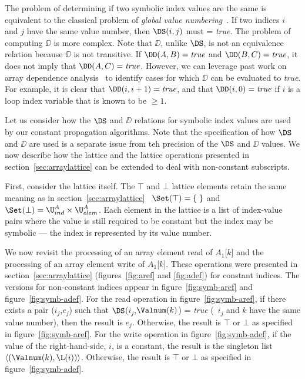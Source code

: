 The problem of determining
if two symbolic index values are the same is equivalent to the
classical problem of {\it global value numbering}~\cite{AlWZ88,Much97}. If two indices $i$
and $j$ have the same value number, then $\DS(i,j)$ must = {\it true}.
The problem of computing
$\DD$ is more complex. Note that $\DD$, unlike $\DS$, is not an
equivalence relation because $\DD$ is not transitive.
If $\DD(A, B)=\mbox{\it true}$
and $\DD(B, C)=\mbox{\it true}$, it does
not imply that $\DD(A, C)=\mbox{\it true}$.  
However, we can leverage past work on array dependence analysis~\cite{Wolf89}
to identify cases for which $\DD$ can be
evaluated to {\it true}.  For example, it is clear that $\DD(i,
i+1) = \mbox{\it true}$,
and that $\DD(i, 0) = \mbox{\it true}$ if $i$ is a loop index variable
that is known to be $\geq 1$.

Let us consider how the $\DS$ and $\DD$ relations for 
symbolic index values
are used by our constant
propagation algorithms.  Note that the specification of how $\DS$ and $\DD$
are used is a separate issue from teh precision of
the $\DS$ and $\DD$ values.
We now describe how 
the lattice and the lattice operations presented in
section~\ref{sec:arraylattice} can be extended
to deal with non-constant subscripts.

First, consider the lattice itself. 
The 
$\top$ and $\bot$ lattice elements retain
the same meaning as in section~\ref{sec:arraylattice}
\viz\ $\Set(\top) = \{\;\}$ and 
$\Set(\bot) =  \U^A_{ind} \times \U^A_{elem}$.
Each element in the lattice is a list
of index-value pairs where the value is still required to
be constant but the index may be symbolic --- the index is
represented by its value number.

We now revisit the processing of an array element read of $A_1$[$k$] and
the processing of an array element write of $A_1$[$k$]. These
operations were presented in section~\ref{sec:arraylattice}
(figures~\ref{fig:aref} and \ref{fig:adef})
for constant indices. The versions for
non-constant indices appear in figure~\ref{fig:symb-aref} and
figure~\ref{fig:symb-adef}.
For the read operation in figure~\ref{fig:symb-aref}, if there exists a pair ($i_j$,$e_j$) such that
$\DS$($i_j$,$\Valnum(k)$) = {\it true} (\ie\ $i_j$ and $k$ have the
same value number), then the
result is $e_j$.  Otherwise, the result is $\top$ or $\bot$ as specified
in figure~\ref{fig:symb-aref}.
For the write operation in figure~\ref{fig:symb-adef}, if the value of the right-hand-side, $i$, is a constant, the result is the singleton list
$\langle(\Valnum(k),\L(i))\rangle$.  Otherwise, the result is $\top$ or $\bot$ as specified
in figure~\ref{fig:symb-adef}.

